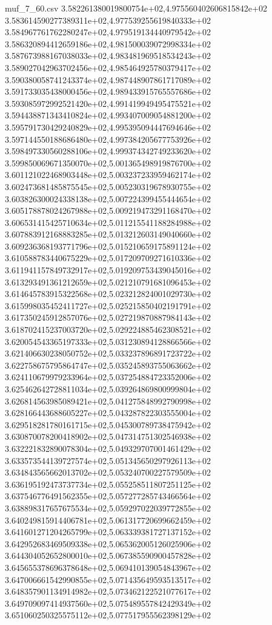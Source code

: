 \begin{filecontents*}{muf_7_60.csv}
3.582261380019800754e+02,4.975560402606815842e+02
3.583614590277389311e+02,4.977539255619840333e+02
3.584967761762280247e+02,4.979519134440979542e+02
3.586320894412659186e+02,4.981500039072998334e+02
3.587673988167038033e+02,4.983481969518534243e+02
3.589027042963702456e+02,4.985464925780379417e+02
3.590380058741243374e+02,4.987448907861717089e+02
3.591733035438000456e+02,4.989433915765557686e+02
3.593085972992521420e+02,4.991419949495475521e+02
3.594438871343410824e+02,4.993407009054881200e+02
3.595791730429240829e+02,4.995395094447694646e+02
3.597144550188686480e+02,4.997384205677753926e+02
3.598497330560288106e+02,4.999374342749233620e+02
3.599850069671350070e+02,5.001365498919876700e+02
3.601121022468903448e+02,5.003237233959462174e+02
3.602473681485875545e+02,5.005230319678930755e+02
3.603826300024338138e+02,5.007224399455444654e+02
3.605178878024267988e+02,5.009219473291168470e+02
3.606531415425710634e+02,5.011215541188284988e+02
3.607883912168883285e+02,5.013212603149040660e+02
3.609236368193771796e+02,5.015210659175891124e+02
3.610588783440675229e+02,5.017209709271610336e+02
3.611941157849732917e+02,5.019209753439045016e+02
3.613293491361212659e+02,5.021210791681096453e+02
3.614645783915322568e+02,5.023212824001029730e+02
3.615998035452411727e+02,5.025215850402191791e+02
3.617350245912857076e+02,5.027219870887984143e+02
3.618702415237003720e+02,5.029224885462308521e+02
3.620054543365197333e+02,5.031230894128866566e+02
3.621406630238050752e+02,5.033237896891723722e+02
3.622758675795864747e+02,5.035245893755063662e+02
3.624110679979233964e+02,5.037254884723352006e+02
3.625462642728811034e+02,5.039264869800999804e+02
3.626814563985089421e+02,5.041275848992790998e+02
3.628166443688605227e+02,5.043287822303555004e+02
3.629518281780161715e+02,5.045300789738475942e+02
3.630870078200418902e+02,5.047314751302546938e+02
3.632221832890078304e+02,5.049329707001461429e+02
3.633573544139727574e+02,5.051345650297926113e+02
3.634843565662013702e+02,5.053240700227579509e+02
3.636195192473737734e+02,5.055258511807251125e+02
3.637546776491562355e+02,5.057277285743466564e+02
3.638898317657675534e+02,5.059297022039772855e+02
3.640249815914406781e+02,5.061317720699662459e+02
3.641601271204265799e+02,5.063339381727137152e+02
3.642952683469509338e+02,5.065362005126025906e+02
3.644304052652800010e+02,5.067385590900457828e+02
3.645655378696378648e+02,5.069410139054843967e+02
3.647006661542990855e+02,5.071435649593513517e+02
3.648357901134914982e+02,5.073462122521077617e+02
3.649709097414937560e+02,5.075489557842429349e+02
3.651060250325575112e+02,5.077517955562398129e+02

\end{filecontents*}
